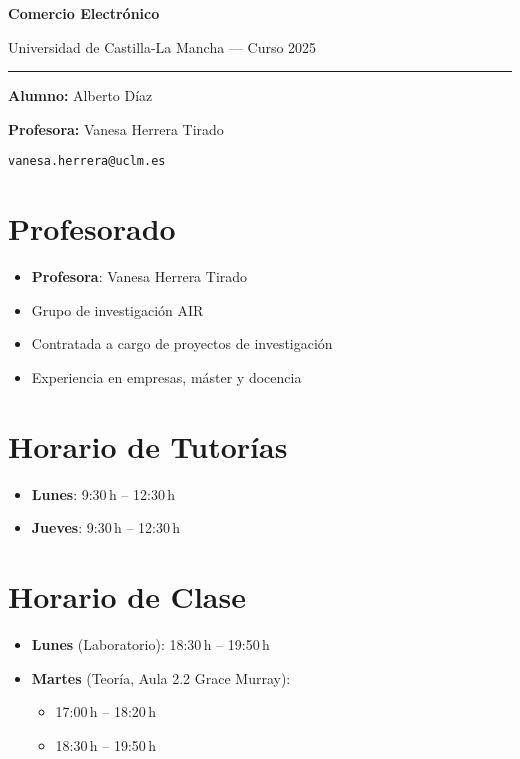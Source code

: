 \documentclass[11pt,a4paper]{article}
\begin{document}
	\begin{titlepage}
		\centering
		\vspace*{2cm}
		{\huge \bfseries Comercio Electrónico \par}
		\vspace{0.7cm}
		{\Large Universidad de Castilla-La Mancha --- Curso 2025 \par}
		\vspace{0.5cm}
		\rule{0.8\linewidth}{0.8pt} \par
		\vspace{0.5cm}
		{\faUser\; \textbf{Alumno:} Alberto Díaz \par}
		\vspace{0.2cm}
		{\faChalkboardTeacher\; \textbf{Profesora:} Vanesa Herrera Tirado \par}
		\vspace{0.2cm}
		{\faEnvelope\; \texttt{vanesa.herrera@uclm.es} \par}
		\vfill
	\end{titlepage}

	\section*{Profesorado}
	\begin{itemize}[leftmargin=1.5em]
		\item \textbf{Profesora}: Vanesa Herrera Tirado
		\item Grupo de investigación AIR
		\item Contratada a cargo de proyectos de investigación
		\item Experiencia en empresas, máster y docencia
	\end{itemize}

	\section*{Horario de Tutorías}
	\begin{itemize}[leftmargin=1.5em]
		\item \textbf{Lunes}: 9:30\,h -- 12:30\,h
		\item \textbf{Jueves}: 9:30\,h -- 12:30\,h
	\end{itemize}

	\section*{Horario de Clase}
	\begin{itemize}[leftmargin=1.5em]
		\item \textbf{Lunes} (Laboratorio): 18:30\,h -- 19:50\,h
		\item \textbf{Martes} (Teoría, Aula 2.2 Grace Murray):
		\begin{itemize}
			\item 17:00\,h -- 18:20\,h
			\item 18:30\,h -- 19:50\,h
		\end{itemize}
	\end{itemize}
\end{document}
